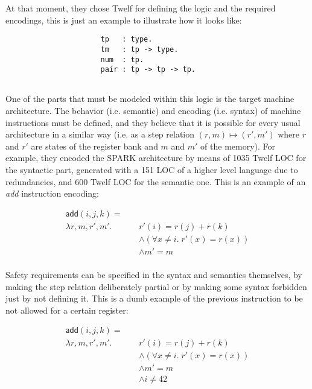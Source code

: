 \documentclass{article}
\begin{document}
At that moment, they chose Twelf for defining the logic and
the required encodings, this is just an example to 
illustrate how it looks like:

\begin{verbatim}
                      tp   : type.
                      tm   : tp -> type.
                      num  : tp.
                      pair : tp -> tp -> tp.
                      
\end{verbatim}

One of the parts that must be modeled within this logic is 
the target machine architecture. The behavior (i.e. 
semantic) and encoding (i.e. syntax) of machine 
instructions must be defined, and they believe that it is
possible for every usual architecture in a similar way 
(i.e. as a step relation $(r,m) \mapsto (r',m')$ where $r$ 
and $r'$ are states of the register bank and $m$ and $m'$ 
of the memory). For example, they encoded the SPARK 
architecture by means of 1035 Twelf LOC for the syntactic 
part, generated with a 151 LOC of a higher level language 
due to redundancies, and 600 Twelf LOC for the semantic 
one. This is an example of an \textit{add} instruction 
encoding:

\begin{align*}
  \mathsf{add}(i, j, k) = \;\;\;\;&\\ 
    \lambda r,m,r',m'.\;&r'(i) = r(j) + r(k) \\
      &\land (\forall x \neq i.\;r'(x) = r(x)) \\
      &\land m' = m \\
\end{align*}

Safety requirements can be specified in the syntax and 
semantics themselves, by making the step relation 
deliberately partial or by making some syntax forbidden 
just by not defining it. This is a dumb example of the 
previous instruction to be not allowed for a certain 
register:

\begin{align*}
  \mathsf{add}(i, j, k) = \;\;\;\;&\\ 
    \lambda r,m,r',m'.\;&r'(i) = r(j) + r(k) \\
      &\land (\forall x \neq i.\;r'(x) = r(x)) \\
      &\land m' = m \\
      &\land i \neq 42 \\
\end{align*}
\end{document}

